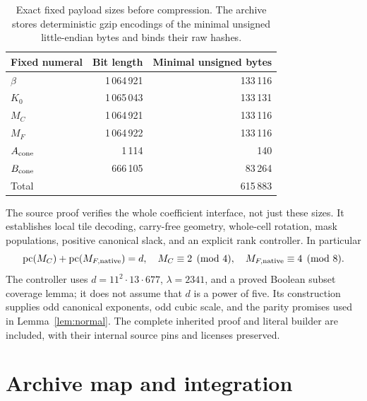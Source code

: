\documentclass[11pt,a4paper]{article}
\theoremstyle{definition}\newtheorem{definition}[theorem]{Definition}
\theoremstyle{remark}\newtheorem{remark}[theorem]{Remark}
\numberwithin{equation}{section}
\begin{document}
\begin{table}[ht]\centering
\begin{tabular}{lrr}\toprule
Fixed numeral & Bit length & Minimal unsigned bytes\\\midrule
\(\beta\)&1\,064\,921&133\,116\\
\(K_0\)&1\,065\,043&133\,131\\
\(M_C\)&1\,064\,921&133\,116\\
\(M_F\)&1\,064\,922&133\,116\\
\(A_{\rm cone}\)&1\,114&140\\
\(B_{\rm cone}\)&666\,105&83\,264\\\midrule
Total&&615\,883\\\bottomrule
\end{tabular}
\caption{Exact fixed payload sizes before compression.
The archive stores deterministic gzip encodings of the minimal
unsigned little-endian bytes and binds their raw hashes.}
\end{table}

The source proof verifies the whole coefficient interface, not just
these sizes. It establishes local tile decoding, carry-free geometry,
whole-cell rotation, mask populations, positive canonical slack, and
an explicit rank controller. In particular
\[
\operatorname{pc}(M_C)+\operatorname{pc}(M_{F,\rm native})=d,\quad
M_C\equiv2\pmod4,\quad M_{F,\rm native}\equiv4\pmod8.
\]
The controller uses
\(d=11^2\cdot13\cdot677\), \(\lambda=2341\), and a proved Boolean
subset coverage lemma; it does not assume that \(d\) is a power of
five. Its construction supplies odd canonical exponents, odd cubic
scale, and the parity promises used in Lemma~\ref{lem:normal}.
The complete inherited proof and literal builder are included,
with their internal source pins and licenses preserved.

\section{Archive map and integration}\label{app:files}
\end{document}
